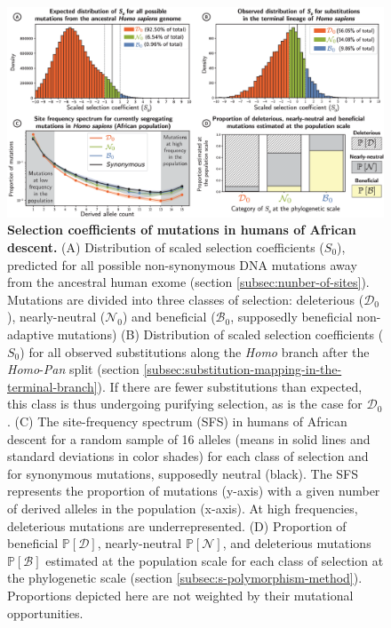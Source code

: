 \documentclass[10pt,letterpaper]{article}
\newcommand{\proba}{\mathbb{P}}
\newcommand{\Sphy}{S_{0}}
\newcommand{\SphyDel}{\mathcal{D}_0}
\newcommand{\SphyNeu}{\mathcal{N}_0}
\newcommand{\SphyBen}{\mathcal{B}_0}
\newcommand{\SpopDel}{\mathcal{D}}
\newcommand{\SpopNeu}{\mathcal{N}}
\newcommand{\SpopBen}{\mathcal{B}}
\newcommand{\ProbaPopDel}{\proba [ \SpopDel]}
\newcommand{\ProbaPopNeu}{\proba [ \SpopNeu ]}
\newcommand{\ProbaPopBen}{\proba [ \SpopBen ]}
\begin{document}
\begin{figure}[!ht]
\begin{adjustwidth}{-2.25in}{0in} %
\centering
\includegraphics[width=1.4\textwidth, page=1] {figure3.eps}
\caption{
{\bf Selection coefficients of mutations in humans of African descent.}
(A) Distribution of scaled selection coefficients ($\Sphy$), predicted for all possible non-synonymous DNA mutations away from the ancestral human exome (section \ref{subsec:nunber-of-sites}).
Mutations are divided into three classes of selection: deleterious ($\SphyDel$), nearly-neutral ($\SphyNeu$) and beneficial ($\SphyBen$, supposedly beneficial non-adaptive mutations)
(B) Distribution of scaled selection coefficients ($\Sphy$) for all observed substitutions along the \textit{Homo} branch after the \textit{Homo}-\textit{Pan} split (section \ref{subsec:substitution-mapping-in-the-terminal-branch}).
If there are fewer substitutions than expected, this class is thus undergoing purifying selection, as is the case for $\SphyDel$.
(C) The site-frequency spectrum (SFS) in humans of African descent for a random sample of 16 alleles (means in solid lines and standard deviations in color shades) for each class of selection and for synonymous mutations, supposedly neutral (black). The SFS represents the proportion of mutations (y-axis) with a given number of derived alleles in the population (x-axis).
At high frequencies, deleterious mutations are underrepresented.
(D) Proportion of beneficial $\ProbaPopDel$, nearly-neutral $\ProbaPopNeu$, and deleterious mutations $\ProbaPopBen$ estimated at the population scale for each class of selection at the phylogenetic scale (section \ref{subsec:s-polymorphism-method}). Proportions depicted here are not weighted by their mutational opportunities.
}
\label{fig:homo-afr-results}
\end{adjustwidth}
\end{figure}
\end{document}
